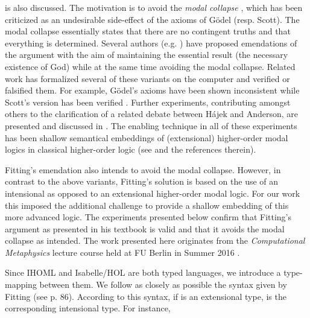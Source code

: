 \begin{isabellebody}
\begin{isamarkuptext}
is also discussed. The motivation is to avoid the \emph{modal collapse} \cite{Sobel,sobel2004logic}, which has been criticized
as an undesirable side-effect of the axioms of G\"odel (resp. Scott). The modal collapse essentially  
states that there are no contingent truths and that everything is determined.
Several authors (e.g. \cite{anderson90:_some_emend_of_goedel_ontol_proof,AndersonGettings,Hajek2002,bjordal99}) 
have proposed emendations of the argument with the aim of maintaining the essential result 
(the necessary existence of God) while at the same time avoiding the modal collapse. 
Related work  has formalized several of these variants on the computer and verified or falsified them. For example,
G\"odel's axioms \cite{GoedelNotes} have been shown inconsistent \cite{C55,C60}
while Scott's version has been verified \cite{ECAI}. Further experiments, contributing amongst others
to the clarification of a related debate between H\'ajek and Anderson, are presented and discussed in
\cite{J23}. The enabling technique in all of these experiments has been
shallow semantical embeddings of (extensional) higher-order modal logics in classical higher-order
logic (see \cite{J23,R59} and the references therein).%
\end{isamarkuptext}\isamarkuptrue%
%
\begin{isamarkuptext}%
Fitting's emendation also intends to avoid the modal collapse. However, in contrast to the above variants, Fitting's
solution is based on the use of an intensional as opposed to an extensional higher-order modal logic.
For our work this imposed the additional challenge to provide a shallow embedding of this more advanced
logic. The experiments presented below confirm that Fitting's argument as presented in his textbook \cite{Fitting}
is valid and that it avoids the modal collapse as intended. The work presented here originates from 
the \emph{Computational Metaphysics} lecture course held at FU Berlin in Summer 2016 \cite{C65}.%
\end{isamarkuptext}\isamarkuptrue%
%
\isamarkuptrue%
%
\isamarkuptrue%
%
\begin{isamarkuptext}%
Since IHOML and Isabelle/HOL are both typed languages, we introduce a type-mapping between them.
We follow as closely as possible the syntax given by Fitting (see p. 86). According to this syntax,
if \isa{{\isasymtau}} is an extensional type, \isa{{\isasymup}{\isasymtau}} is the corresponding intensional type. For instance,

\end{isamarkuptext}
\end{isabellebody}
